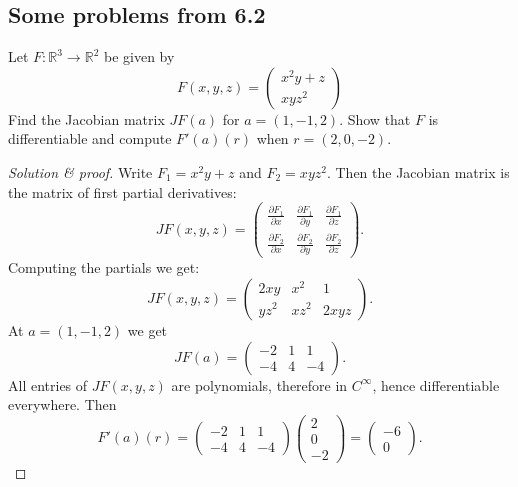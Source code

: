 \subsection{Some problems from 6.2}
\begin{prob}
    Let $F : \mathbb R^3 \to \mathbb R^2$ be given 
    by 
    \[
        F(x,y,z) = 
        \begin{pmatrix}
            x^2y + z \\ 
            xyz^2
        \end{pmatrix}
    \]
    Find the Jacobian matrix $JF(a)$ for $a = (1,-1,2)$. 
    Show that $F$ is differentiable 
    and compute $F'(a)(r)$ when $r = (2,0,-2)$.
\end{prob}
\begin{proof}[Solution \& proof]
    Write $F_1 = x^2y + z$ and $F_2 = xyz^2$.
    Then the Jacobian matrix is the matrix of first partial 
    derivatives: 
    \[
        JF(x,y,z)=
        \begin{pmatrix}
            \frac{\partial F_1}{\partial x} & 
            \frac{\partial F_1}{\partial y} & 
            \frac{\partial F_1}{\partial z}\\[4pt]
            \frac{\partial F_2}{\partial x} & 
            \frac{\partial F_2}{\partial y} & 
            \frac{\partial F_2}{\partial z}
        \end{pmatrix}.
    \]
    Computing the partials we get: 
    \[
        JF(x,y,z)=
        \begin{pmatrix}
            2xy & x^2 & 1\\
            yz^2 & xz^2 & 2xyz
        \end{pmatrix}.
    \]
    At $a = (1,-1,2)$ we get 
    \[
        \boxed{
            JF(a)=
            \begin{pmatrix}
                -2 & 1 & 1\\
                -4 & 4 & -4
            \end{pmatrix}.
        }
    \]
    All entries of $JF(x,y,z)$ are polynomials, therefore 
    in $C^\infty$, hence differentiable everywhere.
    Then 
    \[
        F'(a)(r)=
        \begin{pmatrix}
            -2 & 1 & 1\\
            -4 & 4 & -4
        \end{pmatrix}
        \begin{pmatrix}
            2\\0\\-2
        \end{pmatrix}
        = 
        \begin{pmatrix}
            -6 \\ 0
        \end{pmatrix}.
    \]
\end{proof}


